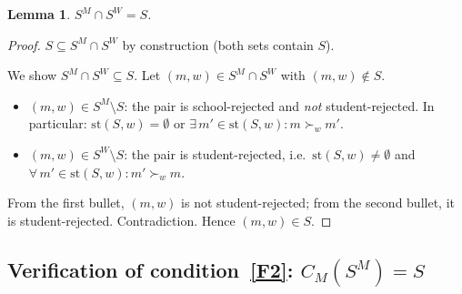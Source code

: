 \documentclass[12pt, a4paper]{article}
\theoremstyle{definition}
\theoremstyle{plain}
\newtheorem{lemma}[definition]{Lemma}
\theoremstyle{remark}
\newcommand{\CM}{C_M}
\newcommand{\SM}{S^M}
\newcommand{\SW}{S^W}
\newcommand{\stud}[2]{\mathrm{st}(#1,#2)}
\begin{document}
\begin{lemma}
\label{lem:intersection}
$\SM \cap \SW = S$.
\end{lemma}
\begin{proof}
$S \subseteq \SM \cap \SW$ by construction (both sets contain $S$).

We show $\SM \cap \SW \subseteq S$. Let $(m, w) \in \SM \cap \SW$ with
$(m, w) \notin S$.
\begin{itemize}
  \item $(m, w) \in \SM \setminus S$: the pair is school-rejected and
    \emph{not} student-rejected. In particular: $\stud{S}{w} = \emptyset$ or
    $\exists\, m' \in \stud{S}{w} : m \succ_w m'$.
  \item $(m, w) \in \SW \setminus S$: the pair is student-rejected, i.e.\
    $\stud{S}{w} \neq \emptyset$ and $\forall\, m' \in \stud{S}{w} : m' \succ_w m$.
\end{itemize}
From the first bullet, $(m, w)$ is not student-rejected; from the second
bullet, it is student-rejected. Contradiction. Hence $(m, w) \in S$.
\end{proof}

\subsection{Verification of condition~\eqref{F2}: $\CM(\SM) = S$}
\end{document}
